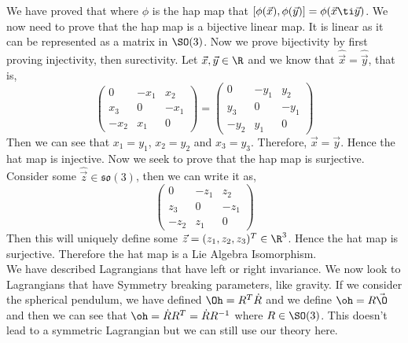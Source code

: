 \noindent
We have proved that where $\phi$ is the hap map that $[\phi(\vec x), \phi(\vec y)] = \phi(\vec x \ti \vec y)$. We now need to prove that the hap map is a bijective linear map. It is linear as it can be represented as a matrix in $\SO(3)$. Now we prove bijectivity by first proving injectivity, then surectivity. Let $\vec x, \vec y \in \R$ and we know that $\hat{\vec x} = \hat{\vec y}$, that is,
$$ \begin{pmatrix}
  0 & -x_1 & x_2 \\ x_3 & 0 & -x_1 \\ -x_2 & x_1 & 0
\end{pmatrix} = \begin{pmatrix}
  0 & -y_1 & y_2 \\ y_3 & 0 & -y_1 \\ -y_2 & y_1 & 0
\end{pmatrix} $$
Then we can see that $x_1 = y_1$, $x_2 = y_2$ and $x_3 = y_3$. Therefore, $\vec x = \vec y$. Hence the hat map is injective. Now we seek to prove that the hap map is surjective. Consider some $\hat{\vec z} \in \mathfrak{so}(3)$, then we can write it as,
$$ \begin{pmatrix}
  0 & -z_1 & z_2 \\ z_3 & 0 & -z_1 \\ -z_2 & z_1 & 0
\end{pmatrix} $$
Then this will uniquely define some $\vec z = (z_1, z_2, z_3)^T \in \R^3$. Hence the hat map is surjective. Therefore the hat map is a Lie Algebra Isomorphism.\\

\noindent
We have described Lagrangians that have left or right invariance. We now look to Lagrangians that have Symmetry breaking parameters, like gravity. If we consider the spherical pendulum, we have defined $\Oh = R^T\dot R$ and we define $\oh = R\vec\O$ and then we can see that $\oh = \dot R R^T = \dot R R^{-1}$ where $R \in \SO(3)$. This doesn't lead to a symmetric Lagrangian but we can still use our theory here. \\

